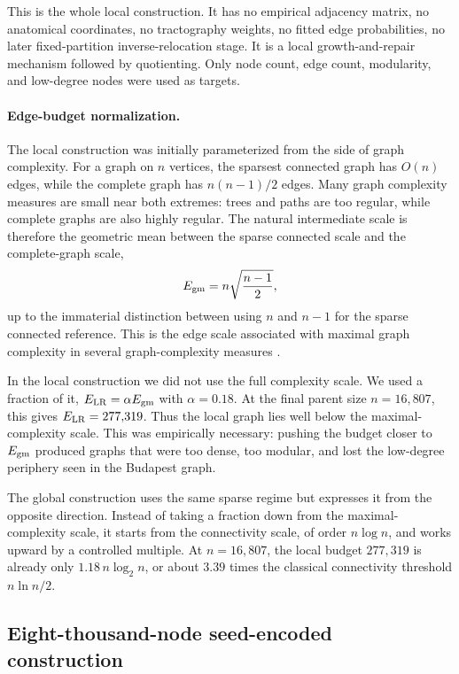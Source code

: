 \documentclass[12pt]{article}
\begin{document}
This is the whole local construction.  It has no empirical adjacency matrix,
no anatomical coordinates, no tractography weights, no fitted edge
probabilities, no later fixed-partition inverse-relocation stage.  It is a local
growth-and-repair mechanism followed by quotienting.  Only node count, edge
count, modularity, and low-degree nodes were used as targets.


\paragraph{Edge-budget normalization.}
The local construction was initially parameterized from the side of graph
complexity.  For a graph on \(n\) vertices, the sparsest connected graph has
\(O(n)\) edges, while the complete graph has \(n(n-1)/2\) edges.  Many graph
complexity measures are small near both extremes: trees and paths are too
regular, while complete graphs are also highly regular.  The natural
intermediate scale is therefore the geometric mean between the sparse
connected scale and the complete-graph scale,
\[
E_{\rm gm}
=
n\sqrt{\frac{n-1}{2}},
\]
up to the immaterial distinction between using \(n\) and \(n-1\) for the
sparse connected reference.  This is the edge scale associated with maximal
graph complexity in several graph-complexity measures
\cite{KimWilhelm2008ComplexGraph}.

In the local construction we did not use the full complexity scale.  We used
a fraction of it, \(E_{\rm LR}=\alpha E_{\rm gm}\) with \(\alpha=0.18\).  At
the final parent size \(n=16{,}807\), this gives \(E_{\rm LR}=277{,}319\).
Thus the local graph lies well below the maximal-complexity scale.  This was
empirically necessary: pushing the budget closer to \(E_{\rm gm}\) produced
graphs that were too dense, too modular, and lost the low-degree periphery
seen in the Budapest graph.

The global construction uses the same sparse regime but expresses it from
the opposite direction.  Instead of taking a fraction down from the
maximal-complexity scale, it starts from the connectivity scale, of order
\(n\log n\), and works upward by a controlled multiple.  At \(n=16{,}807\),
the local budget \(277{,}319\) is already only \(1.18\,n\log_2 n\), or about
\(3.39\) times the classical connectivity threshold \(n\ln n/2\).





\subsection{Eight-thousand-node seed-encoded construction}
\label{supp:eightk-methods}
\end{document}
